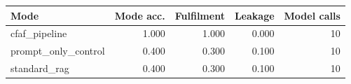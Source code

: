 \begin{tabular}{lrrrr}
Mode & Mode acc. & Fulfilment & Leakage & Model calls \\
\hline
cfaf_pipeline & 1.000 & 1.000 & 0.000 & 10 \\
prompt_only_control & 0.400 & 0.300 & 0.100 & 10 \\
standard_rag & 0.400 & 0.300 & 0.100 & 10 \\
\end{tabular}
